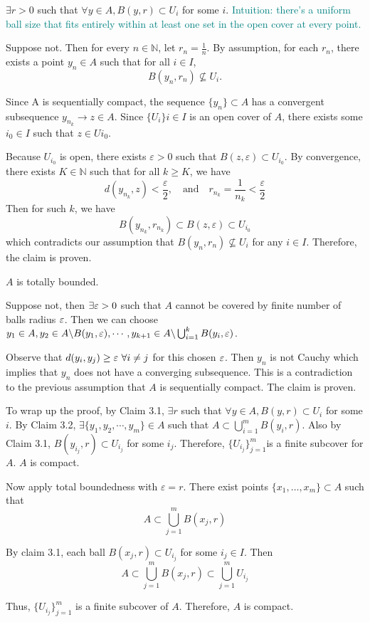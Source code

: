 \documentclass[12pt, letterpaper]{article}
\begin{document}
\begin{prf*}
\begin{clm}{ $\exists r>0$ such that $\forall y\in A, B(y, r)\subset U_i$ for some $i$.}
\textcolor{teal}{Intuition: there’s a uniform ball size that fits entirely within at least one set in the open cover at every point.}
\end{clm}

Suppose not. Then for every $n \in \mathbb{N}$, let $r_n = \frac{1}{n}$. By assumption, for each $r_n$, there exists a point $y_n \in A$ such that for all $i \in I$,
\[
B(y_n, r_n) \nsubseteq U_i.
\]

Since A is sequentially compact, the sequence $\{y_n\} \subset A$ has a convergent subsequence $y_{n_k} \to z \in A$. Since $\{U_i\}{i \in I}$ is an open cover of $A$, there exists some $i_0 \in I$ such that $z \in U{i_0}$.

Because $U_{i_0}$ is open, there exists $\varepsilon > 0$ such that $B(z, \varepsilon) \subset U_{i_0}$. By convergence, there exists $K \in \mathbb{N}$ such that for all $k \geq K$, we have
$$d(y_{n_k}, z) < \frac{\varepsilon}{2}, \quad \text{and} \quad r_{n_k} = \frac{1}{n_k} < \frac{\varepsilon}{2}$$
Then for such $k$, we have
$$B(y_{n_k}, r_{n_k}) \subset B(z, \varepsilon) \subset U_{i_0}$$
which contradicts our assumption that \( B(y_n, r_n) \nsubseteq U_i \) for any $i \in I$. Therefore, the claim is proven. \\

\begin{clm}{ $A$ is totally bounded.}
\end{clm}

Suppose not, then $\exists {\varepsilon}>0$ such that $A$ cannot be covered by finite number of balls radius ${\varepsilon}$. Then we can choose $y_1\in A, y_2\in A\backslash B(y_1, {\varepsilon}), \cdots, y_{k+1} \in A \backslash \bigcup_{i=1}^{k}B(y_i, {\varepsilon})$.

Observe that $d(y_i, y_j)\geq {\varepsilon} \ \forall i\neq j$ for this chosen ${\varepsilon}$. Then $y_n$ is not Cauchy which implies that $y_n$ does not have a converging subsequence. This is a contradiction to the previous assumption that $A$ is sequentially compact. The claim is proven. 


To wrap up the proof, by Claim 3.1, $\exists r$ such that $\forall y\in A, B(y, r)\subset U_i$ for some $i$. By Claim 3.2, $\exists \{y_1, y_2, \cdots, y_m\}\in A$ such that $A\subset \bigcup_{i=1}^{m} B(y_i, r)$. Also by Claim 3.1, $B(y_{i_j}, r) \subset U_{i_j}$ for some $i_j$. Therefore, $\{U_{i_j}\}_{j=1}^{m}$is a finite subcover for $A$. $A$ is compact. 

Now apply total boundedness with $\varepsilon = r$. There exist points $\{x_1, \dots, x_m\} \subset A$ such that
$$A \subset \bigcup_{j=1}^{m} B(x_j, r)$$

By claim 3.1, each ball $B(x_j, r) \subset U_{i_j}$ for some $i_j \in I$. Then
$$A \subset \bigcup_{j=1}^{m} B(x_j, r) \subset \bigcup_{j=1}^{m} U_{i_j}$$

Thus, $\{U_{i_j}\}_{j=1}^{m}$ is a finite subcover of $A$. Therefore, $A$ is compact.


\end{prf*}
\end{document}
